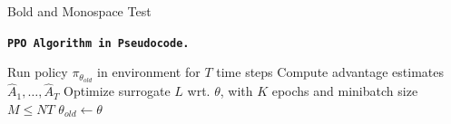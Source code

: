 \begin{appendices}
Bold and Monospace Test

\textbf{\texttt{PPO Algorithm in Pseudocode.}}

\begin{algorithm}
	\caption{PPO}
	\begin{algorithmic}[1]
				\State Run policy $\pi_{\theta_{old}}$ in environment for $T$ time steps
				\State Compute advantage estimates $\hat{A}_{1},\ldots,\hat{A}_{T}$
			\EndFor
			\State Optimize surrogate $L$ wrt. $\theta$, with $K$ epochs and minibatch size $M\leq NT$
			\State $\theta_{old}\leftarrow\theta$
		\EndFor
	\end{algorithmic}
\end{algorithm}

\end{appendices}
